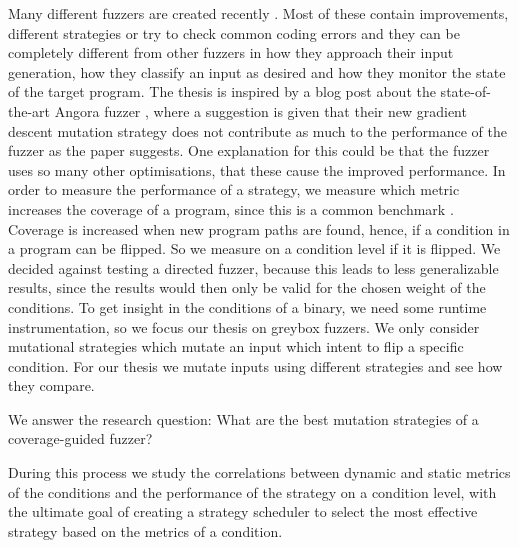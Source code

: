 Many different fuzzers are created recently \cite{bohme2017coverage, bohme2017directed, osterlund2020parmesan, kersten2017poster}. Most of these contain improvements, different strategies or try to check common coding errors and they can be completely different from other fuzzers in how they approach their input generation, how they classify an input as desired and how they monitor the state of the target program. The thesis is inspired by a blog post \cite{angora2020blogpost} about the state-of-the-art Angora fuzzer \cite{chen2018angora}, where a suggestion is given that their new gradient descent mutation strategy does not contribute as much to the performance of the fuzzer as the paper suggests. One explanation for this could be that the fuzzer uses so many other optimisations, that these cause the improved performance.
In order to measure the performance of a strategy, we measure which metric increases the coverage of a program, since this is a common benchmark \cite{aflfuzzer, metzman2020fuzzbench, aizatsky2016ossfuzz}. Coverage is increased when new program paths are found, hence, if a condition in a program can be flipped. So we measure on a condition level if it is flipped.
We decided against testing a directed fuzzer, because this leads to less generalizable results, since the results would then only be valid for the chosen weight of the conditions.
To get insight in the conditions of a binary, we need some runtime instrumentation, so we focus our thesis on greybox fuzzers. We only consider mutational strategies which mutate an input which intent to flip a specific condition.
For our thesis we mutate inputs using different strategies and see how they compare.

We answer the research question: What are the best mutation strategies of a coverage-guided fuzzer? 

During this process we study the correlations between dynamic and static metrics of the conditions and the performance of the strategy on a condition level, with the ultimate goal of creating a strategy scheduler to select the most effective strategy based on the metrics of a condition.

